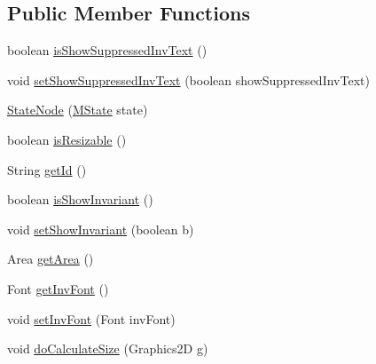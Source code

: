 \subsection*{Public Member Functions}
\begin{DoxyCompactItemize}
\item 
boolean \hyperlink{classorg_1_1tzi_1_1use_1_1gui_1_1views_1_1diagrams_1_1statemachine_1_1_state_node_ae7aa45b59a6fdb8177405dd1aa4b4ae5}{is\-Show\-Suppressed\-Inv\-Text} ()
\item 
void \hyperlink{classorg_1_1tzi_1_1use_1_1gui_1_1views_1_1diagrams_1_1statemachine_1_1_state_node_afaed6a10fe5e7c2b674577264269b23f}{set\-Show\-Suppressed\-Inv\-Text} (boolean show\-Suppressed\-Inv\-Text)
\item 
\hyperlink{classorg_1_1tzi_1_1use_1_1gui_1_1views_1_1diagrams_1_1statemachine_1_1_state_node_a82a5189dc734597c7c9a80bd82668bfe}{State\-Node} (\hyperlink{classorg_1_1tzi_1_1use_1_1uml_1_1mm_1_1statemachines_1_1_m_state}{M\-State} state)
\item 
boolean \hyperlink{classorg_1_1tzi_1_1use_1_1gui_1_1views_1_1diagrams_1_1statemachine_1_1_state_node_af8ad9648faa0ab63c7959ce392512fc4}{is\-Resizable} ()
\item 
String \hyperlink{classorg_1_1tzi_1_1use_1_1gui_1_1views_1_1diagrams_1_1statemachine_1_1_state_node_a17f247d76cc516f15cbd4dc1eaa3b883}{get\-Id} ()
\item 
boolean \hyperlink{classorg_1_1tzi_1_1use_1_1gui_1_1views_1_1diagrams_1_1statemachine_1_1_state_node_af1d85ba18cb856b806346964651843bb}{is\-Show\-Invariant} ()
\item 
void \hyperlink{classorg_1_1tzi_1_1use_1_1gui_1_1views_1_1diagrams_1_1statemachine_1_1_state_node_af7285649fac5cfdefaf48510870b1965}{set\-Show\-Invariant} (boolean b)
\item 
Area \hyperlink{classorg_1_1tzi_1_1use_1_1gui_1_1views_1_1diagrams_1_1statemachine_1_1_state_node_a10e7ffb572c02be6180ac588c759e443}{get\-Area} ()
\item 
Font \hyperlink{classorg_1_1tzi_1_1use_1_1gui_1_1views_1_1diagrams_1_1statemachine_1_1_state_node_a3fdee5b84597c403a9f5461f49047c6e}{get\-Inv\-Font} ()
\item 
void \hyperlink{classorg_1_1tzi_1_1use_1_1gui_1_1views_1_1diagrams_1_1statemachine_1_1_state_node_a57d9e7c74ea4c3692788e36797762bfc}{set\-Inv\-Font} (Font inv\-Font)
\item 
void \hyperlink{classorg_1_1tzi_1_1use_1_1gui_1_1views_1_1diagrams_1_1statemachine_1_1_state_node_a966cc1d5d97c8419f37a1206a355f5b9}{do\-Calculate\-Size} (Graphics2\-D g)

\end{DoxyCompactItemize}
